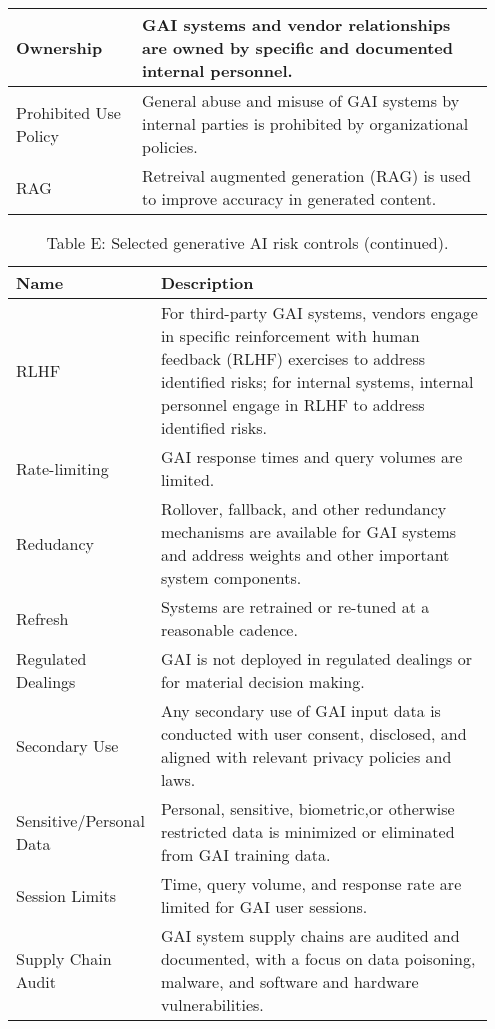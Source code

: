 \documentclass[fleqn]{article}
\begin{document}
\begin{table}[H]
\begin{tabular}{|m{0.25\linewidth} |m{0.70\linewidth} |}
		Ownership & GAI systems and vendor relationships are owned by specific and documented internal personnel. \\ \hline
		Prohibited Use Policy & General abuse and misuse of GAI systems by internal parties is prohibited by organizational policies. \\ \hline
		RAG & Retreival augmented generation (RAG) is used to improve accuracy in generated content.  \\ \hline
	\end{tabular}
\end{table}		
		
\pagebreak		
	
\begin{table}[H]
	\caption*{Table E: Selected generative AI risk controls (continued).}
	\label{tab:controls_cont}
	\scriptsize
	\begin{tabular}{|m{0.25\linewidth} |m{0.70\linewidth} |}
		\hline
		\textbf{Name} & \textbf{Description} \\
		\hline		
		RLHF & For third-party GAI systems, vendors engage in specific reinforcement with human feedback (RLHF) exercises to address identified risks; for internal systems, internal personnel engage in RLHF to address identified risks.   \\ \hline
		Rate-limiting  & GAI response times and query volumes are limited.  \\ \hline
		Redudancy & Rollover, fallback, and other redundancy mechanisms are available for GAI systems and address weights and other important system components.   \\ \hline
		Refresh & Systems are retrained or re-tuned at a reasonable cadence.  \\ \hline
		Regulated Dealings & GAI is not deployed in regulated dealings or for material decision making.  \\ \hline
		Secondary Use & Any secondary use of GAI input data is conducted with user consent, disclosed, and aligned with relevant privacy policies and laws. \\ \hline
		Sensitive/Personal Data  & Personal, sensitive, biometric,or otherwise restricted data is minimized or eliminated from GAI training data.  \\ \hline
		Session Limits & Time, query volume, and response rate are limited for GAI user sessions. \\ \hline
		Supply Chain Audit & GAI system supply chains are audited and documented, with a focus on data poisoning, malware, and software and hardware vulnerabilities.   \\ \hline

\end{tabular}
\end{table}
\end{document}
